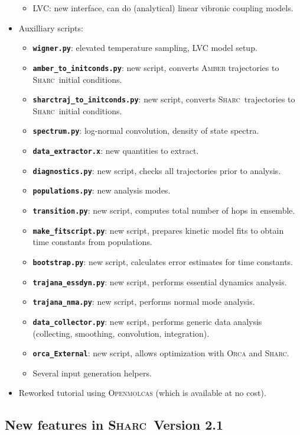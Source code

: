 \documentclass[a4paper,10pt,DIV=15,openany]{scrbook}
\newcommand{\sharc}{\textsc{Sharc}}
\newcommand{\ttt}[1]{\textbf{\texttt{#1}}}
\begin{document}
\begin{itemize}
\begin{itemize}
    \item LVC: new interface, can do (analytical) linear vibronic coupling models.
  \end{itemize}
  \item Auxilliary scripts:
  \begin{itemize}
    \item \ttt{wigner.py}: elevated temperature sampling, LVC model setup.
    \item \ttt{amber\_to\_initconds.py}: new script, converts \textsc{Amber} trajectories to \sharc\ initial conditions.
    \item \ttt{sharctraj\_to\_initconds.py}: new script, converts \sharc\ trajectories to \sharc\ initial conditions.
    \item \ttt{spectrum.py}: log-normal convolution, density of state spectra.
    \item \ttt{data\_extractor.x}: new quantities to extract.
    \item \ttt{diagnostics.py}: new script, checks all trajectories prior to analysis.
    \item \ttt{populations.py}: new analysis modes.
    \item \ttt{transition.py}: new script, computes total number of hops in ensemble.
    \item \ttt{make\_fitscript.py}: new script, prepares kinetic model fits to obtain time constants from populations.
    \item \ttt{bootstrap.py}: new script, calculates error estimates for time constants.
    \item \ttt{trajana\_essdyn.py}: new script, performs essential dynamics analysis.
    \item \ttt{trajana\_nma.py}: new script, performs normal mode analysis.
    \item \ttt{data\_collector.py}: new script, performs generic data analysis (collecting, smoothing, convolution, integration).
    \item \ttt{orca\_External}: new script, allows optimization with \textsc{Orca} and \sharc.
    \item Several input generation helpers.
  \end{itemize}
  \item Reworked tutorial using \textsc{Openmolcas} (which is available at no cost).
\end{itemize}


\subsection{New features in \sharc\ Version 2.1}
\end{document}
